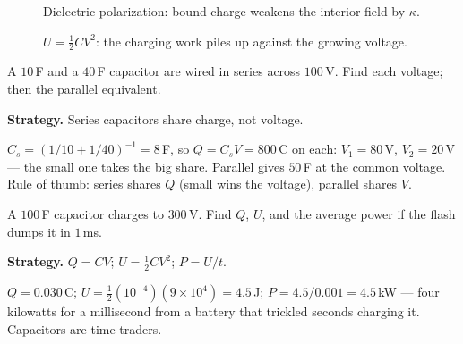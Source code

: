 \begin{figure}[htbp]\centering

\caption{Dielectric polarization: bound charge weakens the interior
field by $\kappa$.}
\label{fig:diel}
\end{figure}

\begin{figure}[htbp]\centering

\caption{$U=\tfrac12CV^{2}$: the charging work piles up against the
growing voltage.}
\label{fig:uenergy}
\end{figure}

\begin{example}\label{ex:series}
A $10$\,\textmu F and a $40$\,\textmu F capacitor are wired in series
across $100$\,V. Find each voltage; then the parallel equivalent.
\par\smallskip
\textbf{Strategy.} Series capacitors share charge, not voltage.
\begin{solution}
$C_s=(1/10+1/40)^{-1}=8$\,\textmu F, so $Q=C_sV=800$\,\textmu C on
each: $V_1=80$\,V, $V_2=20$\,V --- the small one takes the big share.
Parallel gives $50$\,\textmu F at the common voltage. Rule of thumb:
series shares $Q$ (small wins the voltage), parallel shares $V$.
\checkmark
\end{solution}
\end{example}

\begin{example}\label{ex:flash}
A $100$\,\textmu F capacitor charges to $300$\,V. Find $Q$, $U$, and
the average power if the flash dumps it in $1$\,ms.
\par\smallskip
\textbf{Strategy.} $Q=CV$; $U=\tfrac12CV^{2}$; $P=U/t$.
\begin{solution}
$Q=0.030$\,C; $U=\tfrac12(10^{-4})(9\times10^{4})=4.5$\,J;
$P=4.5/0.001=4.5$\,kW --- four kilowatts for a millisecond from a
battery that trickled seconds charging it. Capacitors are time-traders.
\checkmark
\end{solution}
\end{example}

